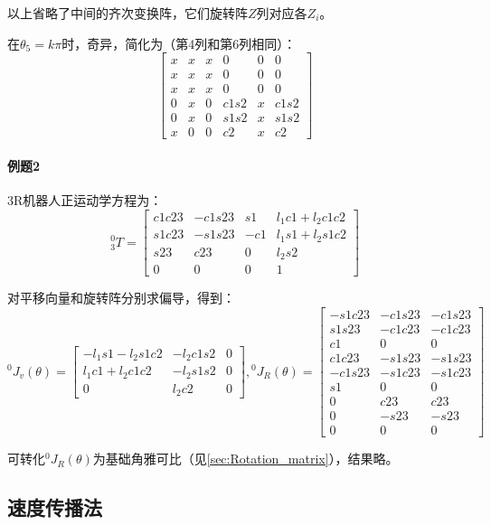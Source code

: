\documentclass[
12pt, %
a4paper, 
oneside, %
headinclude,footinclude, %
]{scrartcl}
\begin{document}
{以上省略了中间的齐次变换阵，它们旋转阵$ Z $列对应各$ Z_i $。

在$ \theta_5 = k\pi $时，奇异，简化为（第4列和第6列相同）：
$$ \begin{bmatrix} x & x & x & 0 & 0 & 0 \\ x & x & x & 0 & 0 & 0 \\ x & x & x & 0 & 0 & 0 \\ 0 & x & 0 & c1 s2 & x & c1 s2 \\ 0 & x & 0 & s1 s2 & x & s1 s2 \\ x & 0 & 0 & c2 & x & c2 \end{bmatrix} $$
}
\paragraph{例题2}\label{sec:example4.2}
{\footnotesize
3R机器人正运动学方程为：
$$ {}_3^0 T = \begin{bmatrix} c1 c23 & -c1 s23 & s1 & l_1 c1 + l_2 c1 c2 \\ s1 c23 & -s1 s23 & -c1 & l_1 s1 + l_2 s1 c2 \\ s23 & c23 & 0 & l_2 s2 \\ 0 & 0 & 0 & 1 \end{bmatrix} $$

对平移向量和旋转阵分别求偏导，得到：
$$
{}^0 J_v(\theta) = \begin{bmatrix} -l_1 s1 - l_2 s1 c2 & -l_2 c1 s2 & 0 \\ l_1 c1 + l_2 c1 c2 & -l_2 s1 s2 & 0 \\ 0 & l_2 c2 & 0 \end{bmatrix},
{}^0 J_R(\theta) = \begin{bmatrix} -s1 c23 & -c1 s23 & -c1 s23 \\ s1 s23 & -c1 c23 & -c1 c23 \\ c1 & 0 & 0 \\ c1 c23 & -s1 s23 & -s1 s23 \\ -c1 s23 & -s1 c23 & -s1 c23 \\ s1 & 0 & 0 \\ 0 & c23 & c23 \\ 0 & -s23 & -s23 \\ 0 & 0 & 0 \end{bmatrix}
$$

可转化$ {}^0 J_R(\theta) $为基础角雅可比（见\ref{sec:Rotation_matrix}），结果略。
}
\subsection[速度传播法]{速度传播法}
\end{document}
